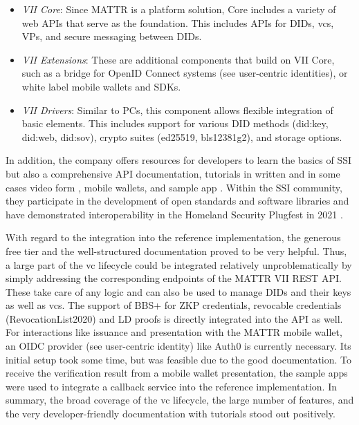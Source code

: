     \begin{itemize}
        \item \textit{VII Core}: Since MATTR is a platform solution, Core includes a variety of web APIs that serve as the foundation. This includes APIs for \acp{DID}, \acp{vc}, \acp{VP}, and secure messaging between \acp{DID}. \cite{mattr_vii_2021}
        \item \textit{VII Extensions}: These are additional components that build on VII Core, such as a bridge for OpenID Connect systems (see user-centric identities), or white label mobile wallets and SDKs. \cite{mattr_vii_2021-1}
        \item \textit{VII Drivers}: Similar to PCs, this component allows flexible integration of basic elements. This includes support for various DID methods (did:key, did:web, did:sov), crypto suites (ed25519, bls12381g2)\cite{mattr_vii_2021-2}, and storage options. \cite{mattr_vii_2021-3}
    \end{itemize}
    
    In addition, the company offers resources for developers to learn the basics of SSI \cite{mattr_resources_2021} but also a comprehensive API documentation, tutorials in written and in some cases video form \cite{mattr_mattr_2021}, mobile wallets, and sample app \cite{mattr_mattr_2021-1, mattr_vii_2021}. Within the \ac{SSI} community, they participate in the development of open standards \cite{mattr_approach_2021, looker_bbs_2021} and software libraries \cite{mattr_mattr_2021-5} and have demonstrated interoperability  in the Homeland Security Plugfest in 2021 \cite{homeland_security_interoperability_2021}.
    
    With regard to the integration into the reference implementation, the generous free tier and the  well-structured documentation proved to be very helpful. Thus, a large part of the \ac{vc} lifecycle could be integrated relatively unproblematically by simply addressing the corresponding endpoints of the MATTR VII REST API. These take care of any logic and can also be used to manage \acp{DID} and their keys as well as \acp{vc}. The support of BBS+ for ZKP credentials, revocable credentials (RevocationList2020) and LD proofs is directly integrated into the API as well. For interactions like issuance and presentation with the MATTR mobile wallet, an OIDC provider (see user-centric identity) like Auth0 is currently necessary. Its initial setup took some time, but was feasible due to the good documentation. To receive the verification result from a mobile wallet presentation, the sample apps were used to integrate a callback service into the reference implementation. In summary, the broad coverage of the \ac{vc} lifecycle, the large number of features, and the very developer-friendly documentation with tutorials stood out positively.
    
